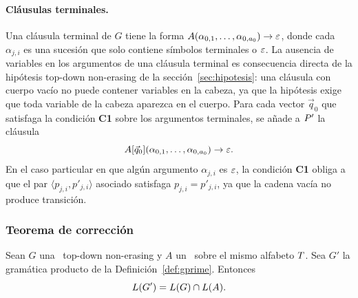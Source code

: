 \paragraph{Cláusulas terminales.} Una cláusula terminal de $G$ tiene la forma $A(\alpha_{0,1}, \dots, \alpha_{0, a_0}) \to \varepsilon$, donde cada $\alpha_{j,i}$ es una sucesión que solo contiene símbolos terminales o $\varepsilon$. La ausencia de variables en los argumentos de una cláusula terminal es consecuencia directa de la hipótesis top-down non-erasing de la sección~\ref{sec:hipotesis}: una cláusula con cuerpo vacío no puede contener variables en la cabeza, ya que la hipótesis exige que toda variable de la cabeza aparezca en el cuerpo. Para cada vector $\vec{q}_0$ que satisfaga la condición \textbf{C1} sobre los argumentos terminales, se añade a $P'$ la cláusula
\[
A[\vec{q}_0](\alpha_{0,1}, \dots, \alpha_{0, a_0}) \to \varepsilon.
\]
En el caso particular en que algún argumento $\alpha_{j,i}$ es $\varepsilon$, la condición \textbf{C1} obliga a que el par $\langle p_{j,i}, p'_{j,i} \rangle$ asociado satisfaga $p_{j,i} = p'_{j,i}$, ya que la cadena vacía no produce transición.

\subsubsection{Teorema de corrección}

\begin{teorema}
\label{thm:correctness}
Sean $G$ una \PRCG\ top-down non-erasing y $A$ un \AFD\ sobre el mismo alfabeto $T$. Sea $G'$ la gramática producto de la Definición~\ref{def:gprime}. Entonces
\[
L(G') = L(G) \cap L(A).
\]
\end{teorema}

